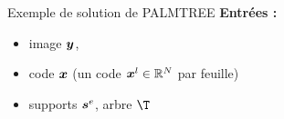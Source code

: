 \begin{frame}{Exemple de solution de PALMTREE}
\textbf{Entrées :} \begin{itemize}
	\item image $\bm{y}$,
	\item code $\bm{x}$ (un code $\bm{x}^l \in \mathbb{R}^N$ par feuille)
	\item supports $\bm{s}^e$, arbre $\T$
\end{itemize}
\begin{figure}\centering
{}
\end{figure}
\end{frame}


